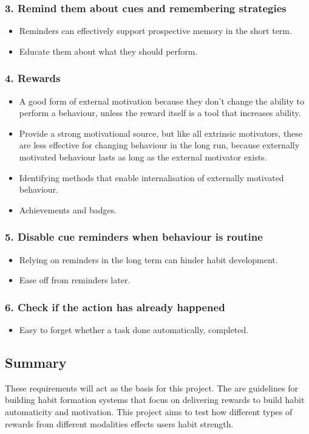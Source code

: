 \subsubsection*{3. Remind them about cues and remembering strategies}
  \begin{itemize}
    \item Reminders can effectively support prospective memory in the short term.
    \item Educate them about what they should perform.
  \end{itemize}

\subsubsection*{4. Rewards}
  \begin{itemize}
    \item A good form of external motivation because they don't change the ability to perform a behaviour, unless the reward itself is a tool that increases ability.
    \item Provide a strong motivational source, but like all extrinsic motivators, these are less effective for changing behaviour in the long run, because externally motivated behaviour lasts as long as the external motivator exists.
    \item Identifying methods that enable internalisation of externally motivated behaviour.
    \item Achievements and badges.
  \end{itemize}

\subsubsection*{5. Disable cue reminders when behaviour is routine}
  \begin{itemize}
    \item Relying on reminders in the long term can hinder habit development.
    \item Ease off from reminders later.
  \end{itemize}

\subsubsection*{6. Check if the action has already happened}
  \begin{itemize}
    \item Easy to forget whether a task done automatically, completed.
  \end{itemize}


\subsection*{Summary}

These requirements will act as the basis for this project. The are guidelines for building habit formation systems that focus on delivering rewards to build habit automaticity and motivation. This project aims to test how different types of rewards from different modalities effects users habit strength.
